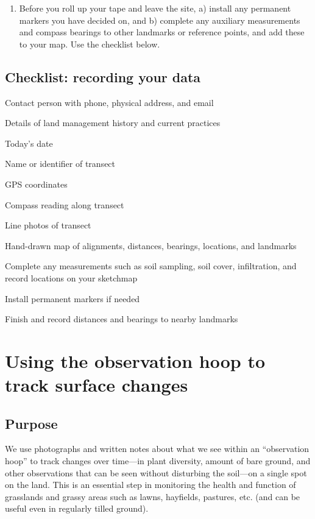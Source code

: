 \documentclass[11pt,letterpaper,twoside,onecolumn]{memoir}
\begin{document}
\begin{enumerate}
\item Before you roll up your tape and leave the site, a) install any permanent markers you have decided on, and b) complete any auxiliary measurements and compass bearings to other landmarks or reference points, and add these to your map. Use the checklist below.

\end{enumerate}
\section*{Checklist: recording your data}

\begin{checkboxlist}
\item Contact person with phone, physical address, and email
\item Details of land management history and current practices
\item Today's date
\item Name or identifier of transect
\item GPS coordinates
\item Compass reading along transect
\item Line photos of transect
\item Hand-drawn map of alignments, distances, bearings, locations, and landmarks
\item Complete any measurements such as soil sampling, soil cover, infiltration, and record locations on your sketchmap
\item Install permanent markers if needed
\item Finish and record distances and bearings to nearby landmarks

\end{checkboxlist}

\chapter{Using the observation hoop to track surface changes}

\section*{Purpose}

We use photographs and written notes about what we see within an ``observation hoop'' to track changes over time---in plant diversity, amount of bare ground, and other observations that can be seen without disturbing the soil---on a single spot on the land. This is an essential step in monitoring the health and function of grasslands and grassy areas such as lawns, hayfields, pastures, etc. (and can be useful even in regularly tilled ground). 
\end{document}
